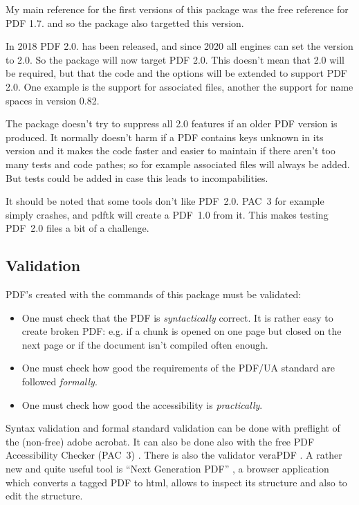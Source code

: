 \documentclass[DIV=12,parskip=half-,bibliography=totoc,a4paper]{article}
\newcommand\PDF{PDF}
\begin{document}
My main reference for the first versions of this package
was the free reference for \PDF{} 1.7. \parencite{pdfreference} and so the package also targetted this version.

In 2018 \PDF{} 2.0. has been released, and since 2020 all engines can set the version to 2.0. So the package will
now target \PDF{} 2.0. This doesn't mean that 2.0 will be required, but that the code and the options will be extended to
support \PDF{} 2.0. One example is the support for associated files, another the support for name spaces in version 0.82.

The package doesn't try to suppress all 2.0 features if an older \PDF{} version is produced. It normally doesn't harm if a \PDF{} contains keys unknown in its version and it makes the code faster and easier to maintain if there aren't too many tests and code pathes; so for example associated files will always be added. But tests could be added in case this leads to incompabilities.

It should be noted that some tools don't like \PDF{}~2.0.  PAC~3 for example 
simply crashes, and pdftk will create a \PDF{}~1.0 from it. This makes 
testing \PDF{}~2.0 files a bit of a challenge. 

\subsection{Validation}


\PDF{}'s created with the commands of this package must be validated:

\begin{itemize}
\item
 One must check that the \PDF{} is \emph{syntactically} correct. It is rather easy to create broken \PDF{}:
 e.g. if a chunk is opened on one page but closed on the next page or if the document isn't compiled often enough.

\item
One must check how good the requirements of the PDF/UA standard are followed \emph{formally}.

\item
One must check how good the accessibility is \emph{practically}.
\end{itemize}


Syntax validation and formal standard validation can be done with preflight 
of the (non-free) adobe acrobat. It can also be done also with the free 
\PDF{} Accessibility Checker (PAC~3) \parencite{pac3}. There is also the 
validator veraPDF \parencite{verapdf}. A rather new and quite useful tool is 
\enquote{Next Generation PDF} \parencite{ngpdf}, a browser application which 
converts a tagged PDF to html, allows to inspect its structure and also to 
edit the structure. 
\end{document}
